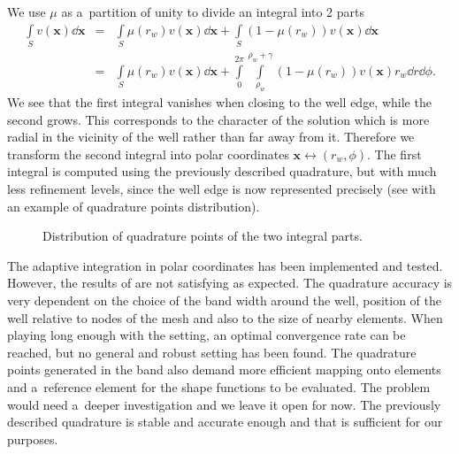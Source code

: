 We use $\mu$ as a~partition of unity to divide an integral into 2 parts
\begin{eqnarray} 
      \int\limits_S v(\mathbf{x}) \dd \mathbf{x} &=& \int\limits_S \mu(r_w) v(\mathbf{x}) \dd \mathbf{x} + \int\limits_S (1-\mu(r_w)) v(\mathbf{x}) \dd \mathbf{x} \nonumber\\
      &=& \int\limits_S \mu(r_w) v(\mathbf{x}) \dd \mathbf{x} + \int\limits_0^{2\pi} \int\limits_{\rho_w}^{\rho_w+\gamma} (1-\mu(r_w)) v(\mathbf{x}) r_w \dd r \dd \phi.
\end{eqnarray}
We see that the first integral vanishes when closing to the well edge, while the second grows. This corresponds
to the character of the solution which is more radial in the vicinity of the well rather than far away from it.
Therefore we transform the second integral into polar coordinates $\mathbf{x} \longleftrightarrow (r_w,\phi)$. 
The first integral is computed using the previously described quadrature, but with much less refinement
levels, since the well edge is now represented precisely (see  with
an example of quadrature points distribution).
%
\begin{figure}[!htb]
  \centering    
  \hspace{0pt}
  \caption[Polar quadrature points]
  {Distribution of quadrature points of the two integral parts.
  }
  \label{fig:polar_quad_points}
\end{figure} 

The adaptive integration in polar coordinates has been implemented and tested.
However, the results of are not satisfying as expected. The quadrature accuracy is very dependent on the choice of
the band width around the well, position of the well relative to nodes of the mesh and also to the size of nearby elements.
When playing long enough with the setting, an optimal convergence rate can be reached, but no general and robust 
setting has been found. The quadrature points generated in the band also demand more efficient mapping onto elements and a~reference element
for the shape functions to be evaluated.
The problem would need a~deeper investigation and we leave it open for now.
The previously described quadrature is stable and accurate enough and that is sufficient for our purposes. 


